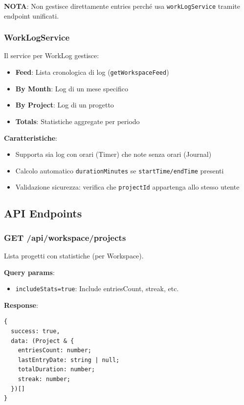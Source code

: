 \documentclass[11pt,a4paper]{article}
\begin{document}
\textbf{NOTA}: Non gestisce direttamente entries perché usa \texttt{workLogService} tramite endpoint unificati.

\subsubsection{WorkLogService}

Il service per WorkLog gestisce:
\begin{itemize}
    \item \textbf{Feed}: Lista cronologica di log (\texttt{getWorkspaceFeed})
    \item \textbf{By Month}: Log di un mese specifico
    \item \textbf{By Project}: Log di un progetto
    \item \textbf{Totals}: Statistiche aggregate per periodo
\end{itemize}

\textbf{Caratteristiche}:
\begin{itemize}
    \item Supporta sia log con orari (Timer) che note senza orari (Journal)
    \item Calcolo automatico \texttt{durationMinutes} se \texttt{startTime/endTime} presenti
    \item Validazione sicurezza: verifica che \texttt{projectId} appartenga allo stesso utente
\end{itemize}

\subsection{API Endpoints}

\subsubsection{GET /api/workspace/projects}

Lista progetti con statistiche (per Workspace).

\textbf{Query params}:
\begin{itemize}
    \item \texttt{includeStats=true}: Include entriesCount, streak, etc.
\end{itemize}

\textbf{Response}:
\begin{lstlisting}
{
  success: true,
  data: (Project & {
    entriesCount: number;
    lastEntryDate: string | null;
    totalDuration: number;
    streak: number;
  })[]
}
\end{lstlisting}
\end{document}
